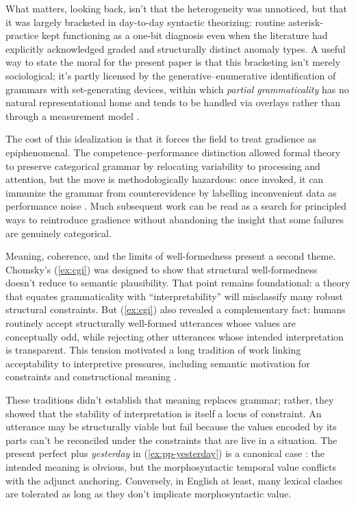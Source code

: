 \documentclass[12pt,letterpaper]{article}
\newcommand{\mention}[1]{\textit{#1}}
\begin{document}
What matters, looking back, isn't that the heterogeneity was unnoticed, but that it was largely bracketed in day-to-day syntactic theorizing: routine asterisk-practice kept functioning as a one-bit diagnosis even when the literature had explicitly acknowledged graded and structurally distinct anomaly types. A useful way to state the moral for the present paper is that this bracketing isn't merely sociological; it's partly licensed by the generative--enumerative identification of grammars with set-generating devices, within which \mention{partial grammaticality} has no natural representational home and tends to be handled via overlays rather than through a measurement model \autocite{pullum_scholz2001mtsges}.

The cost of this idealization is that it forces the field to treat gradience as epiphenomenal. The competence--performance distinction \autocite{chomsky1965} allowed formal theory to preserve categorical grammar by relocating variability to processing and attention, but the move is methodologically hazardous: once invoked, it can immunize the grammar from counterevidence by labelling inconvenient data as performance noise \autocite[71]{schutze2016}. Much subsequent work can be read as a search for principled ways to reintroduce gradience without abandoning the insight that some failures are genuinely categorical.

Meaning, coherence, and the limits of well-formedness present a second theme. Chomsky's (\ref{ex:cgi}) was designed to show that structural well-formedness doesn't reduce to semantic plausibility. That point remains foundational: a theory that equates grammaticality with \enquote{interpretability} will misclassify many robust structural constraints. But (\ref{ex:cgi}) also revealed a complementary fact: humans routinely accept structurally well-formed utterances whose values are conceptually odd, while rejecting other utterances whose intended interpretation is transparent. This tension motivated a long tradition of work linking acceptability to interpretive pressures, including semantic motivation for constraints \autocite{lakoff1971, mccawley1968} and constructional meaning \autocite{goldberg1995constructions}.

These traditions didn't establish that meaning replaces grammar; rather, they showed that the stability of interpretation is itself a locus of constraint. An utterance may be structurally viable but fail because the values encoded by its parts can't be reconciled under the constraints that are live in a situation.
The present perfect plus \mention{yesterday} in (\ref{ex:pp-yesterday}) is a canonical case \autocite[140--141]{huddleston2002}: the intended meaning is obvious, but the morphosyntactic temporal value conflicts with the adjunct anchoring. Conversely, in English at least, many lexical clashes are tolerated as long as they don't implicate morphosyntactic value.
\end{document}
